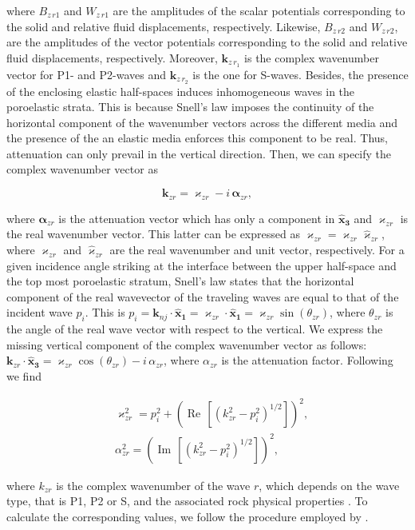 \documentclass[draft]{agujournal2019}
\renewcommand{\Re}{\operatorname{Re} }
\renewcommand{\Im}{\operatorname{Im} }
\begin{document}
where $B_{z\,r1}$ and $W_{z\,r1}$ are the amplitudes of the scalar potentials corresponding to the solid and relative fluid displacements, respectively. Likewise, $B_{z\,r2}$ and $W_{z\,r2}$, are the amplitudes of the vector potentials corresponding to the solid and relative fluid displacements, respectively. Moreover, $\bm{k}_{z\, r_1}$ is the complex wavenumber vector for P1- and P2-waves and $\bm{k}_{z\, r_2}$ is the one for S-waves. Besides,  the  presence of the enclosing elastic half-spaces induces inhomogeneous waves in the poroelastic strata. This is because Snell's law imposes the continuity of the horizontal component of the wavenumber vectors across the different media and the presence of the an elastic media enforces this component to be real. Thus, attenuation can only prevail in the vertical direction. Then, we can specify the complex wavenumber vector as
\begin{linenomath*}
\begin{equation}\label{Eq.a16}
\bm{k}_{zr}= \bm{\varkappa}_{zr} - i\, \bm{\alpha}_{zr},
\end{equation}
\end{linenomath*}
where $\bm{\alpha}_{zr}$ is the attenuation vector which has only a component in $\bm{\hat{x}_3}$ and $\bm{\varkappa}_{zr}$ is the real wavenumber vector. This latter can be expressed as $\bm{\varkappa}_{zr} = \varkappa_{zr} \bm{\hat{\varkappa}}_{zr}$, where $\varkappa_{zr}$ and $\bm{\hat{\varkappa}}_{zr}$  are the  real wavenumber and unit vector, respectively. For a given incidence angle striking at the interface between the upper half-space and the top most poroelastic stratum, Snell's law states that the horizontal component of the real wavevector of the traveling waves are equal to that of the incident wave $p_i$. This is $p_i = \bm{k}_{nj} \cdot \bm{\hat{x}_1} =\bm{\varkappa}_{zr} \cdot \bm{\hat{x}_1} = \varkappa_{zr} \sin(\theta_{zr})$, where $\theta_{zr}$ is the angle of the real wave vector with respect to the vertical. 
We express the missing vertical component of the complex wavenumber vector as follows: $\bm{k}_{zr} \cdot \bm{\hat{x}_3}= \varkappa_{zr}\cos (\theta_{zr}) - i\, \alpha_{zr}$, where $\alpha_{zr}$
is the attenuation factor. Following  we find
\begin{linenomath*}
\begin{equation}\label{Eq.a17}
\begin{split}
& \varkappa_{zr}^2 =p_i^2 + \left(\Re\,[\left( k_{zr}^2 -  p_i^2\right)^{1/2}]\right)^2, \\
& \alpha_{zr}^2 = \left(\Im\,[\left( k_{zr}^2 -  p_i^2\right)^{1/2}]\right)^2, 
\end{split}
\end{equation}
\end{linenomath*}
where $k_{zr}$ is the complex wavenumber of the wave $r$, which depends on the wave type, that is P1, P2 or S, and the associated rock physical properties \cite{Borcherdt1973, Borcherdt1982}. To calculate the corresponding values, we follow the procedure employed by .
\end{document}
